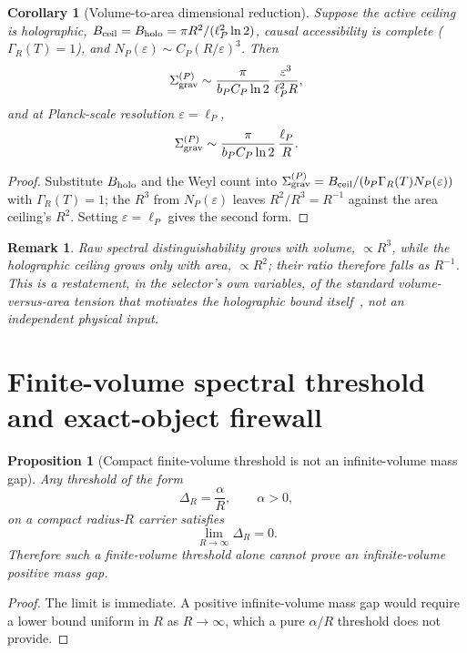 \documentclass[11pt,a4paper]{article}
\newtheorem{proposition}[theorem]{Proposition}
\newtheorem{corollary}[theorem]{Corollary}
\newtheorem{remark}[theorem]{Remark}
\begin{document}
\begin{corollary}[Volume-to-area dimensional reduction]
\label{cor:vol-area-reduction}
Suppose the active ceiling is holographic, $B_{\rm ceil}=B_{\rm holo}=\pi R^2/(\ell_P^2\ln2)$, causal accessibility is complete ($\Gamma_R(T)=1$), and $N_P(\varepsilon)\sim C_P(R/\varepsilon)^3$.  Then
\[
\Sigma_{\rm grav}^{(P)}\sim\frac{\pi}{b_PC_P\ln2}\,\frac{\varepsilon^3}{\ell_P^2R},
\]
and at Planck-scale resolution $\varepsilon=\ell_P$,
\[
\Sigma_{\rm grav}^{(P)}\sim\frac{\pi}{b_PC_P\ln2}\,\frac{\ell_P}{R}.
\]
\end{corollary}
\begin{proof}
Substitute $B_{\rm holo}$ and the Weyl count into $\Sigma_{\rm grav}^{(P)}=B_{\rm ceil}/(b_P\Gamma_R(T)N_P(\varepsilon))$ with $\Gamma_R(T)=1$; the $R^3$ from $N_P(\varepsilon)$ leaves $R^2/R^3=R^{-1}$ against the area ceiling's $R^2$.  Setting $\varepsilon=\ell_P$ gives the second form.\end{proof}
\begin{remark}
Raw spectral distinguishability grows with volume, $\propto R^3$, while the holographic ceiling grows only with area, $\propto R^2$; their ratio therefore falls as $R^{-1}$.  This is a restatement, in the selector's own variables, of the standard volume-versus-area tension that motivates the holographic bound itself~\cite{Bousso2002}, not an independent physical input.
\end{remark}

\section{Finite-volume spectral threshold and exact-object firewall}
\label{sec:threshold-firewall}

\begin{proposition}[Compact finite-volume threshold is not an infinite-volume mass gap]
Any threshold of the form
\[
\Delta_R=\frac{\alpha}{R},\qquad \alpha>0,
\]
on a compact radius-$R$ carrier satisfies
\[
\lim_{R\to\infty}\Delta_R=0.
\]
Therefore such a finite-volume threshold alone cannot prove an infinite-volume positive mass gap.
\end{proposition}
\begin{proof}
The limit is immediate.  A positive infinite-volume mass gap would require a lower bound uniform in $R$ as $R\to\infty$, which a pure $\alpha/R$ threshold does not provide.\end{proof}
\end{document}
